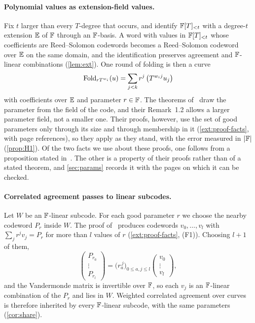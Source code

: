 \paragraph{Polynomial values as extension-field values.} Fix $t$ larger than every
$T$-degree that occurs, and identify $\mathbb{F}[T]_{<t}$ with a degree-$t$ extension $\mathbb{E}$ of $\mathbb{F}$
through an $\mathbb{F}$-basis. A word with values in $\mathbb{F}[T]_{<t}$ whose coefficients are
Reed--Solomon codewords becomes a Reed--Solomon codeword over $\mathbb{E}$ on the same domain, and the
identification preserves agreement and $\mathbb{F}$-linear combinations (\cref{lem:ext}). One round
of folding is then a curve
\[
\mathrm{Fold}_{rT^{w_i}}(u)=\sum_{j<k}r^j\,\big(T^{w_ij}u_j\big)
\]
with coefficients over $\mathbb{E}$ and parameter $r\in\mathbb{F}$. The theorems of~\cite{BCIKS20} draw the
parameter from the field of the code, and their Remark~1.2 allows a larger parameter field,
not a smaller one. Their proofs, however, use the set of good parameters only through its size
and through membership in it (\cref{ext:proof-facts}, with page references), so they apply
as they stand, with the error measured in $|\mathbb{F}|$ (\cref{prop:H1}). Of the two facts we use about these proofs, one follows from a proposition stated
in~\cite{BCIKS20}. The other is a property of their proofs rather than of a stated theorem, and
\cref{sec:params} records it with the pages on which it can be checked.

\paragraph{Correlated agreement passes to linear subcodes.} Let $W$ be an $\mathbb{F}$-linear
subcode. For each good parameter $r$ we choose the nearby codeword $P_r$ inside $W$. The
proof of~\cite{BCIKS20} produces codewords $v_0,\dots,v_l$ with $\sum_jr^jv_j=P_r$ for more
than $l$ values of $r$ (\cref{ext:proof-facts}, (F1)). Choosing $l+1$ of them,
\[
\begin{pmatrix}P_{r_0}\\ \vdots\\ P_{r_l}\end{pmatrix}
=\big(r_a^{\,j}\big)_{0\le a,j\le l}
\begin{pmatrix}v_0\\ \vdots\\ v_l\end{pmatrix},
\]
and the Vandermonde matrix is invertible over $\mathbb{F}$, so each $v_j$ is an $\mathbb{F}$-linear
combination of the $P_r$ and lies in $W$. Weighted correlated agreement over curves is
therefore inherited by every $\mathbb{F}$-linear subcode, with the same parameters
(\cref{cor:share}).

